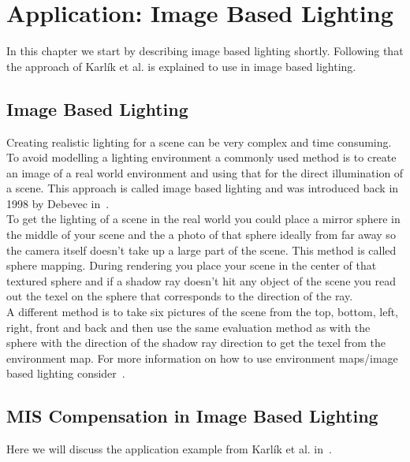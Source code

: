 \chapter{Application: Image Based Lighting}
\label{ch:application_ibl}
In this chapter we start by describing image based lighting shortly.
Following that the approach of Karl\'ik et al. is explained to use in image based lighting.


\section{Image Based Lighting}
\label{sec:ibl}
Creating realistic lighting for a scene can be very complex and time consuming.
To avoid modelling a lighting environment a commonly used method is to create an image of a real world environment
and using that for the direct illumination of a scene.
This approach is called image based lighting and was introduced back in 1998 by Debevec in~\cite{debevec}.\\
To get the lighting of a scene in the real world you could place a mirror sphere in the middle of your scene
and the a photo of that sphere ideally from far away
so the camera itself doesn't take up a large part of the scene.
This method is called sphere mapping.
During rendering you place your scene in the center of that textured sphere
and if a shadow ray doesn't hit any object of the scene you read out the texel
on the sphere that corresponds to the direction of the ray.\\
A different method is to take six pictures of the scene from the top, bottom, left, right, front and back
and then use the same evaluation method as with the sphere with the direction of the shadow ray direction
to get the texel from the environment map.
For more information on how to use environment maps/image based lighting consider~\cite{environment_map}.


\section{MIS Compensation in Image Based Lighting}
\label{sec:misc_ibl}
Here we will discuss the application example from Karl\'ik et al. in~\cite[Section~6-7]{Karlik2019}.


